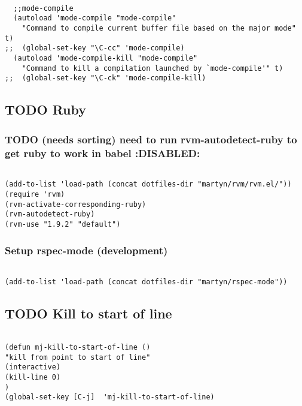 \documentclass[colorlinks=true,urlcolor=blue,listings-sv]{article}
\begin{document}
{{{\lstset{language=Lisp}
\begin{lstlisting}

  ;;mode-compile
  (autoload 'mode-compile "mode-compile"
    "Command to compile current buffer file based on the major mode" t)
;;  (global-set-key "\C-cc" 'mode-compile)
  (autoload 'mode-compile-kill "mode-compile"
    "Command to kill a compilation launched by `mode-compile'" t)
;;  (global-set-key "\C-ck" 'mode-compile-kill)
\end{lstlisting}
\subsection{\textbf{TODO} Ruby}
\label{sec-2-47}
\subsubsection{\textbf{TODO} (needs sorting) need to run rvm-autodetect-ruby to get ruby to work in babel \textbf{:DISABLED:}}
\label{sec-2-47-1}
\label{86bebb8b-e52d-43da-9f7b-a49ef5db14ba}



\lstset{language=Lisp}
\begin{lstlisting}

(add-to-list 'load-path (concat dotfiles-dir "martyn/rvm/rvm.el/"))
(require 'rvm)
(rvm-activate-corresponding-ruby)
(rvm-autodetect-ruby)
(rvm-use "1.9.2" "default")
\end{lstlisting}
\subsubsection{Setup rspec-mode (development)}
\label{sec-2-47-2}
\label{ace283a7-2eb8-4c48-b667-8ebfb419606d}



\lstset{language=Lisp}
\begin{lstlisting}

(add-to-list 'load-path (concat dotfiles-dir "martyn/rspec-mode"))
\end{lstlisting}
\subsection{\textbf{TODO} Kill to start of line}
\label{sec-2-48}



\lstset{language=Lisp}
\begin{lstlisting}

(defun mj-kill-to-start-of-line ()
"kill from point to start of line"
(interactive)
(kill-line 0)
)
(global-set-key [C-j]  'mj-kill-to-start-of-line)
\end{lstlisting}
}}}
\end{document}
